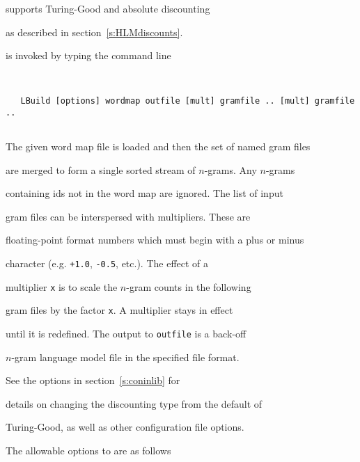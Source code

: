  supports Turing-Good and absolute discounting 


as described in section~\ref{s:HLMdiscounts}.










 is invoked by typing the command line


\begin{verbatim}


   LBuild [options] wordmap outfile [mult] gramfile .. [mult] gramfile ..


\end{verbatim}





The given word map file is loaded and then the set of named gram files


are merged to form a single sorted stream of $n$-grams. Any $n$-grams


containing ids not in the word map are ignored.  The list of input


gram files can be interspersed with multipliers. These are


floating-point format numbers which must begin with a plus or minus


character (e.g. \texttt{+1.0}, \texttt{-0.5}, etc.). The effect of a


multiplier \texttt{x} is to scale the $n$-gram counts in the following


gram files by the factor \texttt{x}. A multiplier stays in effect


until it is redefined. The output to \texttt{outfile} is a back-off


$n$-gram language model file in the specified file format.





See the  options in section~\ref{s:coninlib} for


details on changing the discounting type from the default of


Turing-Good, as well as other configuration file options.





The allowable options to  are as follows





